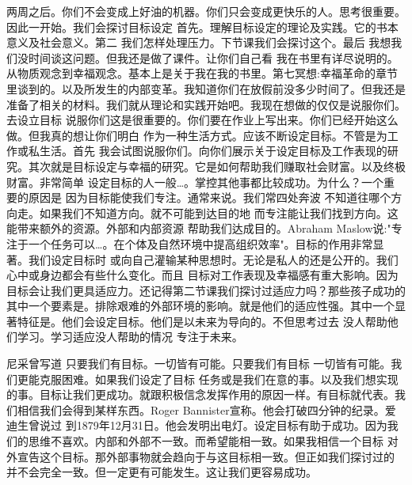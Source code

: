 两周之后。你们不会变成上好油的机器。你们只会变成更快乐的人。思考很重要。因此一开始。我们会探讨目标设定 首先。理解目标设定的理论及实践。它的书本意义及社会意义。第二 我们怎样处理压力。下节课我们会探讨这个。最后 我想我们没时间谈这问题。但我还是做了课件。让你们自己看 我在书里有详尽说明的。从物质观念到幸福观念。基本上是关于我在我的书里。第七冥想:幸福革命的章节里谈到的。以及所发生的内部变革。我知道你们在放假前没多少时间了。但我还是准备了相关的材料。我们就从理论和实践开始吧。我现在想做的仅仅是说服你们。去设立目标 说服你们这是很重要的。你们要在作业上写出来。你们已经开始这么做。但我真的想让你们明白 作为一种生活方式。应该不断设定目标。不管是为工作或私生活。首先 我会试图说服你们。向你们展示关于设定目标及工作表现的研究。其次就是目标设定与幸福的研究。它是如何帮助我们赚取社会财富。以及终极财富。非常简单 设定目标的人一般…。掌控其他事都比较成功。为什么？一个重要的原因是 因为目标能使我们专注。通常来说。我们常四处奔波 不知道往哪个方向走。如果我们不知道方向。就不可能到达目的地 而专注能让我们找到方向。这能带来额外的资源。外部和内部资源 帮助我们达成目的。Abraham Maslow说:"专注于一个任务可以…。在个体及自然环境中提高组织效率"。目标的作用非常显著。我们设定目标时 或向自己灌输某种思想时。无论是私人的还是公开的。我们心中或身边都会有些什么变化。而且 目标对工作表现及幸福感有重大影响。因为目标会让我们更具适应力。还记得第二节课我们探讨过适应力吗？那些孩子成功的其中一个要素是。排除艰难的外部环境的影响。就是他们的适应性强。其中一个显著特征是。他们会设定目标。他们是以未来为导向的。不但思考过去 没人帮助他们学习。学习适应没人帮助的情况 专注于未来。 

尼采曾写道 只要我们有目标。一切皆有可能。只要我们有目标 一切皆有可能。我们更能克服困难。如果我们设定了目标 任务或是我们在意的事。以及我们想实现的事。目标让我们更成功。就跟积极信念发挥作用的原因一样。有目标就代表。我们相信我们会得到某样东西。Roger Bannister宣称。他会打破四分钟的纪录。爱迪生曾说过 到1879年12月31日。他会发明出电灯。设定目标有助于成功。因为我们的思维不喜欢。内部和外部不一致。而希望能相一致。如果我相信一个目标 对外宣告这个目标。那外部事物就会趋向于与这目标相一致。但正如我们探讨过的 并不会完全一致。但一定更有可能发生。这让我们更容易成功。 

